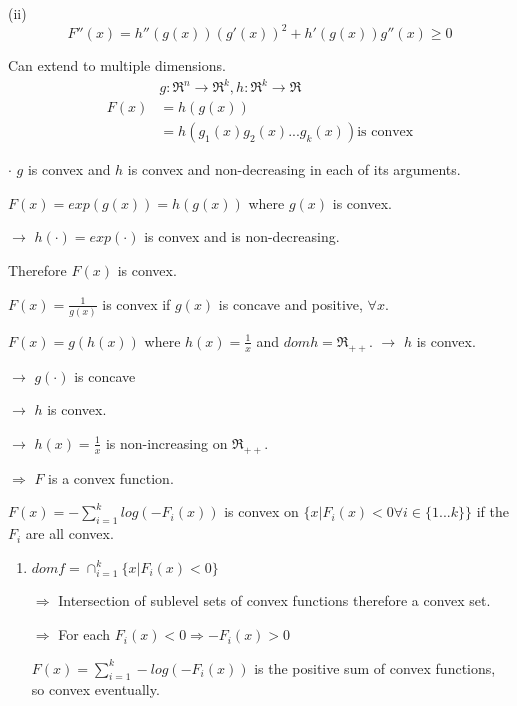 (ii) 
\begin{equation*}
F''(x) = h''(g(x))(g'(x))^2 + h'(g(x))g''(x) \geq 0
\end{equation*}

Can extend to multiple dimensions.
\begin{align*}
&g:\Re^n\rightarrow \Re^k, h:\Re^k\rightarrow \Re\\
F(x) &= h(g(x))\\
&= h(g_1(x) g_2(x)...g_k(x)) \text{is convex}
\end{align*}

$\cdot$ $g$ is convex and $h$ is convex and non-decreasing in each of its arguments. 

\begin{example}
	$F(x) = exp(g(x)) = h(g(x))$ where $g(x)$ is convex. 
	
	$\rightarrow$ $h(\cdot) = exp(\cdot)$ is convex and is non-decreasing.
	
	Therefore $F(x)$ is convex. 
\end{example}

\begin{example}
	$F(x) = \frac{1}{g(x)}$ is convex if $g(x)$ is concave and positive, $\forall x$. 
	
	$F(x) = g(h(x))$ where $h(x) = \frac{1}{x}$ and $domh = \Re_{++}$. $\rightarrow$ $h$ is convex.
	
	$\rightarrow$ $g(\cdot)$ is concave 
	
	$\rightarrow$ $h$ is convex.
	
	$\rightarrow$ $h(x) = \frac{1}{x}$ is non-increasing on $\Re_{++}$.
	
	$\Rightarrow$ $F$ is a convex function. 
\end{example}

\begin{example}
	$F(x) = -\sum^k_{i=1}log(-F_i(x))$ is convex on $\{x\vert F_i(x)<0\forall i\in \{1...k \}  \}$ if the $F_i$ are all convex.
	
	\begin{enumerate}
		\item $domf = \cap^k_{i=1}\{x\vert F_i(x) <0 \}$
		
		$\Rightarrow$ Intersection of sublevel sets of convex functions therefore a convex set.
		
		$\Rightarrow$ For each $F_i(x)<0\Rightarrow -F_i(x) >0$
		
		$F(x) = \sum^k_{i=1} -log(-F_i(x))$ is the positive sum of convex functions, so convex eventually.
	\end{enumerate}
\end{example}









